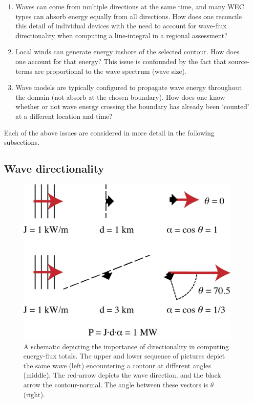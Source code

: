 \documentclass[authoryear,preprint]{elsarticle}
\begin{document}
\begin{enumerate}
\item Waves can come from multiple directions at the same time, and many WEC types can absorb energy equally from all directions. How does one reconcile this detail of individual devices with the need to account for wave-flux directionality when computing a line-integral in a regional assessment?
\item Local winds can generate energy inshore of the selected contour. How does one account for that energy? This issue is confounded by the fact that source-terms are proportional to the wave spectrum (wave size).
\item Wave models are typically configured to propagate wave energy throughout the domain (not absorb at the chosen boundary). How does one know whether or not wave energy crossing the boundary has already been ‘counted’ at a different location and time?
\end{enumerate}

Each of the above issues are considered in more detail in the following subsections.

\subsection{Wave directionality}

\begin{figure}[ht]
  \centering
  \includegraphics[width=0.7\linewidth]{../diagram/Dot-Product_Schematic01}
  \caption{A schematic depicting the importance of directionality in computing energy-flux totals. The upper and lower sequence of pictures depict the same wave (left) encountering a contour at different angles (middle). The red-arrow depicts the wave direction, and the black arrow the contour-normal. The angle between these vectors is $\theta$ (right).}
  \label{fig:directionality}
\end{figure}
\end{document}
